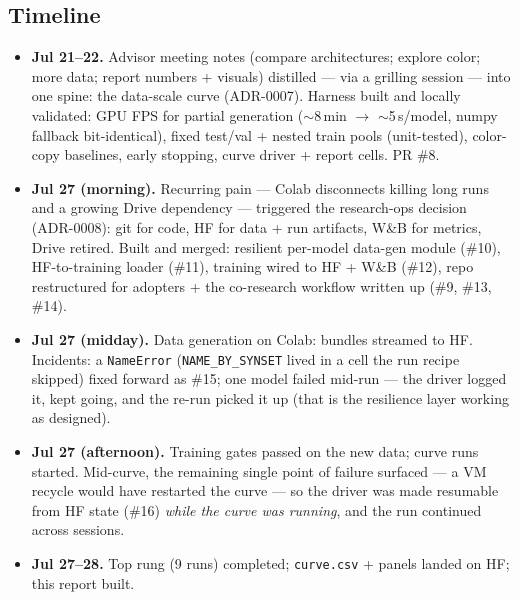 \documentclass[11pt]{article}
\begin{document}
\subsection*{Timeline}
\begin{itemize}
  \item \textbf{Jul 21--22.} Advisor meeting notes (compare architectures; explore color;
  more data; report numbers + visuals) distilled --- via a grilling session --- into one
  spine: the data-scale curve (ADR-0007). Harness built and locally validated: GPU FPS
  for partial generation ($\sim$8\,min $\rightarrow$ $\sim$5\,s/model, numpy fallback
  bit-identical), fixed test/val + nested train pools (unit-tested), color-copy
  baselines, early stopping, curve driver + report cells. PR \#8.
  \item \textbf{Jul 27 (morning).} Recurring pain --- Colab disconnects killing long runs
  and a growing Drive dependency --- triggered the research-ops decision (ADR-0008):
  git for code, HF for data + run artifacts, W\&B for metrics, Drive retired. Built and
  merged: resilient per-model data-gen module (\#10), HF-to-training loader (\#11),
  training wired to HF + W\&B (\#12), repo restructured for adopters + the co-research
  workflow written up (\#9, \#13, \#14).
  \item \textbf{Jul 27 (midday).} Data generation on Colab: \nBundles{} bundles streamed
  to HF. Incidents: a \texttt{NameError} (\texttt{NAME\_BY\_SYNSET} lived in a cell the
  run recipe skipped) fixed forward as \#15; one model failed mid-run --- the driver
  logged it, kept going, and the re-run picked it up (that is the resilience layer
  working as designed).
  \item \textbf{Jul 27 (afternoon).} Training gates passed on the new data; curve runs
  started. Mid-curve, the remaining single point of failure surfaced --- a VM recycle
  would have restarted the curve --- so the driver was made resumable from HF state
  (\#16) \emph{while the curve was running}, and the run continued across sessions.
  \item \textbf{Jul 27--28.} Top rung (9 runs) completed; \texttt{curve.csv} + panels
  landed on HF; this report built.
\end{itemize}
\end{document}
